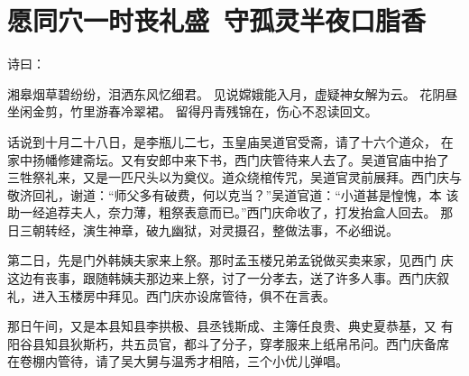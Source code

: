 \chapter{愿同穴一时丧礼盛~守孤灵半夜口脂香}

诗曰：

湘皋烟草碧纷纷，泪洒东风忆细君。
见说嫦娥能入月，虚疑神女解为云。
花阴昼坐闲金剪，竹里游春冷翠裙。
留得丹青残锦在，伤心不忍读回文。

话说到十月二十八日，是李瓶儿二七，玉皇庙吴道官受斋，请了十六个道众，
在家中扬幡修建斋坛。又有安郎中来下书，西门庆管待来人去了。吴道官庙中抬了
三牲祭礼来，又是一匹尺头以为奠仪。道众绕棺传咒，吴道官灵前展拜。西门庆与
敬济回礼，谢道：“师父多有破费，何以克当？”吴道官道：“小道甚是惶愧，本
该助一经追荐夫人，奈力薄，粗祭表意而已。”西门庆命收了，打发抬盒人回去。
那日三朝转经，演生神章，破九幽狱，对灵摄召，整做法事，不必细说。

第二日，先是门外韩姨夫家来上祭。那时孟玉楼兄弟孟锐做买卖来家，见西门
庆这边有丧事，跟随韩姨夫那边来上祭，讨了一分孝去，送了许多人事。西门庆叙
礼，进入玉楼房中拜见。西门庆亦设席管待，俱不在言表。

那日午间，又是本县知县李拱极、县丞钱斯成、主簿任良贵、典史夏恭基，又
有阳谷县知县狄斯朽，共五员官，都斗了分子，穿孝服来上纸帛吊问。西门庆备席
在卷棚内管待，请了吴大舅与温秀才相陪，三个小优儿弹唱。

